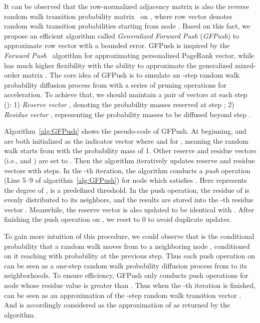  It can be observed that the row-normalized adjacency matrix  is also the reverse random walk transition probability matrix~\cite{chen2020scalable} on , where row vector  denotes random walk transition probabilities starting from node .
Based on this fact, we propose an efficient algorithm called \textit{Generalized Forward Push} (\textit{GFPush}) to approximate row vector  with a bounded error.
GFPush is inspired by the \textit{Forward Push}~\cite{andersen2006local} algorithm for approximating personalized PageRank vector, while has much higher flexibility with the ability to approximate the generalized mixed-order matrix .
The core idea of GFPush is to simulate an -step random walk probability diffusion process from  with a series of pruning operations for acceleration.
To achieve that, we should maintain a pair of vectors at each step  (): 1) \textit{Reserve vector }, denoting the probability masses reserved at step ; 2) \textit{Residue vector }, representing the probability masses to be diffused beyond step .



Algorithm~\ref{alg:GFPush} shows the pseudo-code of GFPush. At beginning,  and  are both initialized as the indicator vector  where  and   for , meaning the random walk starts from  with the probability mass of 1. Other reserve and residue vectors (i.e.,  and ) are set to .
Then the algorithm iteratively updates reserve and residue vectors with  steps. 
In the -th iteration, the algorithm conducts a \textit{push} operation (Line 5--9 of algorithm~\ref{alg:GFPush}) for node  which satisfies . Here  represents the degree of ,
 is a predefined threshold. In the push operation, the residue  of  is evenly distributed to its neighbors, and the results are stored into the -th residue vector
. Meanwhile, the reserve vector  is also updated to be identical with . After finishing the push operation on , we reset  to 0 to avoid duplicate updates.


To gain more intuition of this procedure, we could observe that  is the conditional probability that a random walk moves from  to a neighboring node , conditioned on it reaching  with probability  at the previous step. Thus each push operation on  can be seen as a one-step random walk probability diffusion process from  to its neighborhoods. To ensure efficiency, GFPush only conducts push operations for node  whose residue value is greater than . Thus when the -th iteration is finished,  can be seen as an approximation of the -step random walk transition vector . And   is accordingly considered as the approximation of  as returned by the algorithm. 

